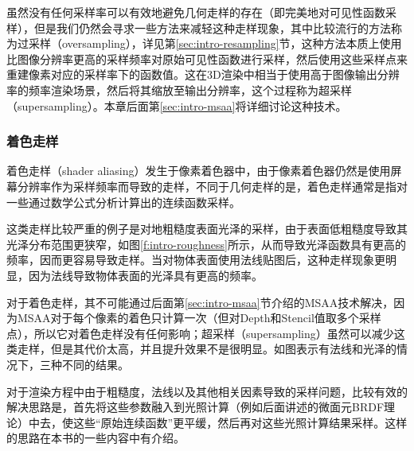 虽然没有任何采样率可以有效地避免几何走样的存在（即完美地对可见性函数采样），但是我们仍然会寻求一些方法来减轻这种走样现象，其中比较流行的方法称为过采样（oversampling），详见第\ref{sec:intro-resampling}节，这种方法本质上使用比图像分辨率更高的采样频率对原始可见性函数进行采样，然后使用这些采样点来重建像素对应的采样率下的函数值。这在3D渲染中相当于使用高于图像输出分辨率的频率渲染场景，然后将其缩放至输出分辨率，这个过程称为超采样（supersampling）。本章后面第\ref{sec:intro-msaa}将详细讨论这种技术。




\subsubsection{着色走样}
着色走样（shader aliasing）发生于像素着色器中，由于像素着色器仍然是使用屏幕分辨率作为采样频率而导致的走样，不同于几何走样的是，着色走样通常是指对一些通过数学公式分析计算出的连续函数采样。

这类走样比较严重的例子是对地粗糙度表面光泽的采样，由于表面低粗糙度导致其光泽分布范围更狭窄，如图\ref{f:intro-roughness}所示，从而导致光泽函数具有更高的频率，因而更容易导致走样。当对物体表面使用法线贴图后，这种走样现象更明显，因为法线导致物体表面的光泽具有更高的频率。

对于着色走样，其不可能通过后面第\ref{sec:intro-msaa}节介绍的MSAA技术解决，因为MSAA对于每个像素的着色只计算一次（但对Depth和Stencil值取多个采样点），所以它对着色走样没有任何影响；超采样（supersampling）虽然可以减少这类走样，但是其代价太高，并且提升效果不是很明显。如图表示有法线和光泽的情况下，三种不同的结果。

对于渲染方程中由于粗糙度，法线以及其他相关因素导致的采样问题，比较有效的解决思路是，首先将这些参数融入到光照计算（例如后面讲述的微面元BRDF理论）中去，使这些“原始连续函数”更平缓，然后再对这些光照计算结果采样。这样的思路在本书的一些内容中有介绍。

